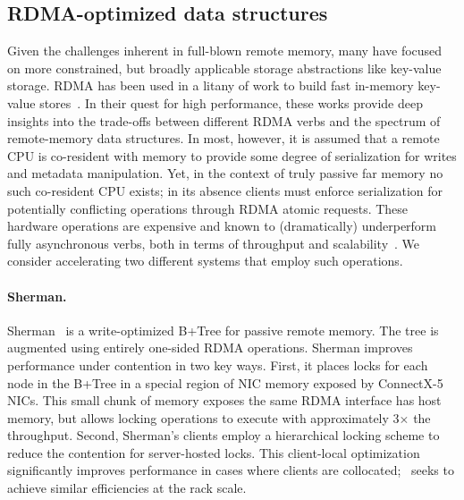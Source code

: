 \subsection{RDMA-optimized data structures}

Given the challenges inherent in full-blown remote memory, many have
focused on more constrained, but broadly applicable storage
abstractions like key-value storage.  RDMA has been used in a litany
of work to build fast in-memory key-value
stores~\cite{farm,MemC3,herd,pilaf,sonuma,storm}. In their quest for
high performance, these works provide deep insights into the
trade-offs between different RDMA verbs and the spectrum of
remote-memory data structures. In most, however, it is assumed that a
remote CPU is co-resident with memory to provide some degree of
serialization for writes and metadata manipulation. Yet, in the
context of truly passive far memory no such co-resident CPU exists;
in its absence clients must enforce serialization for potentially
conflicting operations through RDMA atomic requests. These
hardware operations are expensive and known to (dramatically)
underperform fully asynchronous verbs, both in terms of throughput and
scalability~\cite{design-guidelines}.  We consider accelerating two
different systems that employ such operations.

\paragraph{Sherman.}

Sherman~\cite{sherman} is a write-optimized B+Tree for passive remote memory. The
tree is augmented using entirely one-sided RDMA operations. Sherman
improves performance under contention in two key ways. First, it
places locks for each node in the B+Tree in a special region of NIC
memory exposed by ConnectX-5 NICs.  This small chunk of memory exposes
the same RDMA interface has host memory, but allows locking operations
to execute with approximately 3$\times$ the throughput.  Second,
Sherman's clients employ a hierarchical locking scheme to reduce the
contention for server-hosted locks.  This client-local optimization
significantly improves performance in cases where clients are
collocated; \sword\ seeks to achieve similar efficiencies at the rack
scale.




